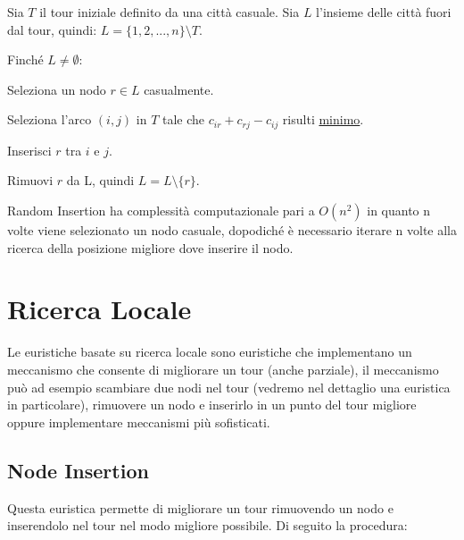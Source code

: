 \documentclass[a4paper,12pt]{report}
\begin{document}
\begin{tcolorbox}[colframe=black,colback=white,boxrule=0.5pt, sharp corners, breakable]
\begin{legal}
  \item Sia $T$ il tour iniziale definito da una città casuale. Sia $L$ l'insieme delle città fuori dal tour, quindi: $L = \{1, 2, ..., n\} \setminus T$.
  \item Finché $L \neq \emptyset$:
  \begin{legal}
    \item Seleziona un nodo $r \in L$ casualmente.
    \item Seleziona l'arco $(i, j)$ in $T$ tale che $c_{ir} + c_{rj} - c_{ij}$ risulti \underline{minimo}.
    \item Inserisci $r$ tra $i$ e $j$.  
    \item Rimuovi $r$ da L, quindi $L = L \setminus \{r\}$.
  \end{legal}
\end{legal}
\end{tcolorbox}
\hfill \break Random Insertion ha complessità computazionale pari a $O(n^2)$ in quanto n volte viene selezionato un nodo casuale, dopodiché è necessario iterare n volte alla ricerca della posizione migliore dove inserire il nodo.

\section{Ricerca Locale}
Le euristiche basate su ricerca locale\cite{Local Search} sono euristiche che implementano un meccanismo che consente di migliorare un tour (anche parziale), il meccanismo può ad esempio scambiare due nodi nel tour (vedremo nel dettaglio una euristica in particolare), rimuovere un nodo e inserirlo in un punto del tour migliore oppure implementare meccanismi più sofisticati.

\subsection{Node Insertion}
Questa euristica permette di migliorare un tour rimuovendo un nodo e inserendolo nel tour nel modo migliore possibile. Di seguito la procedura:
\end{document}
